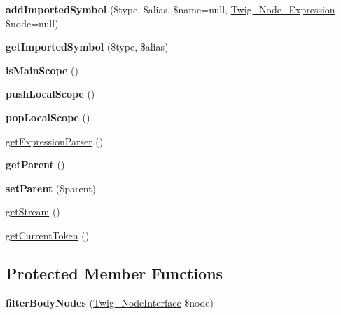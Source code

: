 \begin{DoxyCompactItemize}
\item 
\hypertarget{class_twig___parser_aa27264a7481f89b0004fcc3b72293254}{}{\bfseries add\+Imported\+Symbol} (\$type, \$alias, \$name=null, \hyperlink{class_twig___node___expression}{Twig\+\_\+\+Node\+\_\+\+Expression} \$node=null)\label{class_twig___parser_aa27264a7481f89b0004fcc3b72293254}

\item 
\hypertarget{class_twig___parser_ae8b7646641e0f8417ecc89402fcd0e2f}{}{\bfseries get\+Imported\+Symbol} (\$type, \$alias)\label{class_twig___parser_ae8b7646641e0f8417ecc89402fcd0e2f}

\item 
\hypertarget{class_twig___parser_a9018e83fae9f837d042fa54d713626cc}{}{\bfseries is\+Main\+Scope} ()\label{class_twig___parser_a9018e83fae9f837d042fa54d713626cc}

\item 
\hypertarget{class_twig___parser_afd728d8c584c248c8bf098a8b0e162db}{}{\bfseries push\+Local\+Scope} ()\label{class_twig___parser_afd728d8c584c248c8bf098a8b0e162db}

\item 
\hypertarget{class_twig___parser_a516a18d30a1aa1a09e19d47f3f391c66}{}{\bfseries pop\+Local\+Scope} ()\label{class_twig___parser_a516a18d30a1aa1a09e19d47f3f391c66}

\item 
\hyperlink{class_twig___parser_ace16df8b342fd0e63669db2a8ea3b060}{get\+Expression\+Parser} ()
\item 
\hypertarget{class_twig___parser_a95ecaee3537b1ad29b04ef383a57bbae}{}{\bfseries get\+Parent} ()\label{class_twig___parser_a95ecaee3537b1ad29b04ef383a57bbae}

\item 
\hypertarget{class_twig___parser_a3b949fc022c82eb25e8650e0e01404fa}{}{\bfseries set\+Parent} (\$parent)\label{class_twig___parser_a3b949fc022c82eb25e8650e0e01404fa}

\item 
\hyperlink{class_twig___parser_a3e5834ff3daeecd091712270886a16fb}{get\+Stream} ()
\item 
\hyperlink{class_twig___parser_aa8c70f7e7e5c449b03703ff558a026a5}{get\+Current\+Token} ()
\end{DoxyCompactItemize}
\subsection*{Protected Member Functions}
\begin{DoxyCompactItemize}
\item 
\hypertarget{class_twig___parser_a230d5cb9ac5750b23c9228539ded64fb}{}{\bfseries filter\+Body\+Nodes} (\hyperlink{interface_twig___node_interface}{Twig\+\_\+\+Node\+Interface} \$node)\label{class_twig___parser_a230d5cb9ac5750b23c9228539ded64fb}

\end{DoxyCompactItemize}
